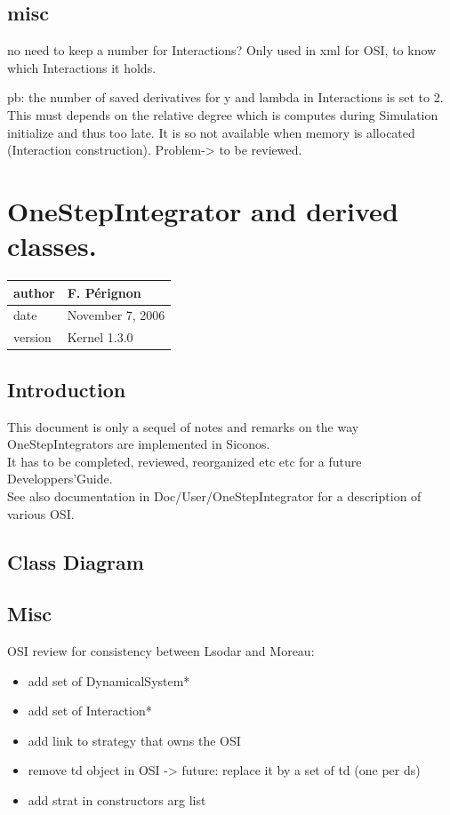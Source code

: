 \documentclass[10pt]{report}
\begin{document}
\ei

\section{misc}

\bei
\item no need to keep a number for Interactions? Only used in xml for OSI, to know which Interactions it holds.
\item pb: the number of saved derivatives for y and lambda in Interactions is set to 2. This must depends on the relative degree which is computes during
Simulation initialize and thus too late. It is so not available when memory is allocated (Interaction construction). Problem-> to be reviewed.
\ei


\chapter{OneStepIntegrator and derived classes.}
\begin{table}[!ht]
  \begin{tabular}{|l|l|}
    \hline
    author  & F.  P\'erignon \\
    \hline
    date    & November 7, 2006 \\
    \hline
    version & Kernel 1.3.0 \\
    \hline
  \end{tabular}
\end{table}

\section{Introduction}
This document is only a sequel of notes and remarks on the way OneStepIntegrators are implemented in Siconos.\\
It has to be completed, reviewed, reorganized etc etc for a future Developpers'Guide. \\
See also documentation in Doc/User/OneStepIntegrator for a description of various OSI.

\section{Class Diagram}

\section{Misc}

OSI review for consistency between Lsodar and Moreau:
\begin{itemize}
\item add set of DynamicalSystem*
\item add set of Interaction*
\item add link to strategy that owns the OSI
\item remove td object in OSI -> future: replace it by a set of td (one per ds)
\item add strat in constructors arg list
\end{itemize}
\end{document}
